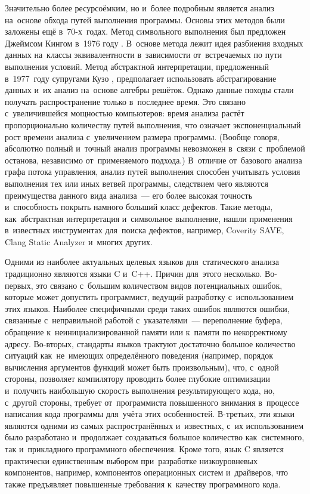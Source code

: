 Значительно более ресурсоёмким, но и~более подробным является анализ на~основе обхода путей выполнения программы. Основы этих методов были заложены ещё в~70-х~годах. Метод символьного выполнения был предложен Джеймсом Кингом в~1976 году \cite{king76}. В~основе метода лежит идея разбиения входных данных на~классы эквивалентности в~зависимости от~встречаемых по пути выполнения условий. Метод абстрактной интерпретации, предложенный в~1977~году супругами Кузо \cite{cousot}, предполагает использовать абстрагирование данных и~их анализ на~основе алгебры решёток. Однако данные походы стали получать распространение только в~последнее время. Это связано с~увеличившейся мощностью компьютеров: время анализа растёт пропорционально количеству путей выполнения, что означает экспоненциальный рост времени анализа с~увеличением размера программы. (Вообще говоря, абсолютно полный и~точный анализ программы невозможен в~связи с~проблемой останова, независимо от~применяемого подхода.) В~отличие от~базового анализа графа потока управления, анализ путей выполнения способен учитывать условия выполнения тех или иных ветвей программы,  следствием чего являются преимущества данного вида анализа~--- его более высокая точность и~способность покрыть намного больший класс дефектов. Такие методы, как~абстрактная интерпретация и~символьное выполнение, нашли применения в~известных инструментах для~поиска дефектов, например, Coverity SAVE, Clang Static Analyzer и~многих других.

Одними из наиболее актуальных целевых языков для~статического анализа традиционно являются языки C и~C++. Причин для~этого несколько. Во-первых, это связано с~большим количеством видов потенциальных ошибок, которые может допустить программист, ведущий разработку с~использованием этих языков. Наиболее специфичными среди таких ошибок являются ошибки, связанные с~неправильной работой с~указателями~--- переполнение буфера, обращение к~неинициализированной памяти или к~памяти по некорректному адресу. Во-вторых, стандарты языков трактуют достаточно большое количество ситуаций как~не~имеющих определённого поведения (например, порядок вычисления аргументов функций может быть произвольным), что, с~одной стороны, позволяет компилятору проводить более глубокие оптимизации и~получить наибольшую скорость выполнения результирующего кода, но, с~другой стороны, требует от~программиста повышенного внимания в~процессе написания кода программы для~учёта этих особенностей. В-третьих, эти языки являются одними из самых распространённых и~известных, с~их использованием было разработано и~продолжает создаваться большое количество как~системного, так и~прикладного программного обеспечения. Кроме того, язык C является практически единственным выбором при~разработке низкоуровневых компонентов, например, компонентов операционных систем и~драйверов, что также предъявляет повышенные требования к~качеству программного кода.

